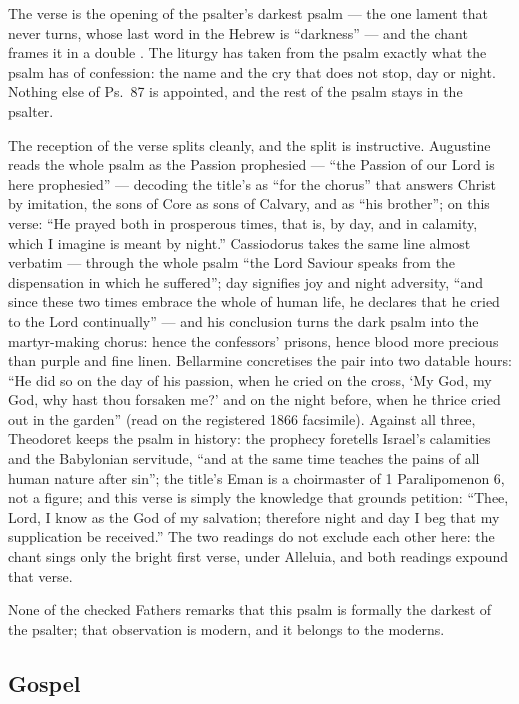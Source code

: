 The verse is the opening of the psalter's darkest psalm --- the one lament
that never turns, whose last word in the Hebrew is ``darkness'' --- and the
chant frames it in a double . The liturgy has taken from the
psalm exactly what the psalm has of confession: the name  and the cry that does not stop, day or night. Nothing else of Ps.~87 is
appointed, and the rest of the psalm stays in the psalter.

The reception of the verse splits cleanly, and the split is instructive.
Augustine reads the whole psalm as the Passion prophesied --- ``the Passion
of our Lord is here prophesied'' --- decoding the title's  as ``for the chorus'' that answers Christ by imitation, the sons of
Core as sons of Calvary, and  as ``his brother''; on this verse:
``He prayed both in prosperous times, that is, by day, and in calamity,
which I imagine is meant by night.'' Cassiodorus takes the same line almost
verbatim --- through the whole psalm ``the Lord Saviour speaks from the
dispensation in which he suffered''; day signifies joy and night adversity,
``and since these two times embrace the whole of human life, he declares
that he cried to the Lord continually'' --- and his conclusion turns the
dark psalm into the martyr-making chorus: hence the confessors' prisons,
hence blood more precious than purple and fine linen. Bellarmine concretises
the pair into two datable hours: ``He did so on the day of his passion, when
he cried on the cross, `My God, my God, why hast thou forsaken me?' and on
the night before, when he thrice cried out in the garden'' (read on the
registered 1866 facsimile). Against all three, Theodoret keeps the psalm in
history: the prophecy foretells Israel's calamities and the Babylonian
servitude, ``and at the same time teaches the pains of all human nature
after sin''; the title's Eman is a choirmaster of 1 Paralipomenon 6, not a
figure; and this verse is simply the knowledge that grounds petition: ``Thee,
Lord, I know as the God of my salvation; therefore night and day I beg that
my supplication be received.'' The two readings do not exclude each other
here: the chant sings only the bright first verse, under Alleluia, and both
readings expound that verse.

None of the checked Fathers remarks that this psalm is formally the darkest of
the psalter; that observation is modern, and it belongs to the moderns.

\elementguard
\subsection*{Gospel }

